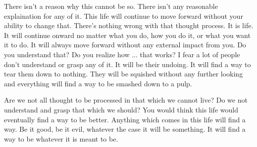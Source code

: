 There isn't a reason why this cannot be so. There isn't any reasonable
explaination for any of it. This life will continue to move forward without your
ability to change that. There's nothing wrong with that thought process. It is
life. It will continue onward no matter what you do, how you do it, or what you
want it to do. It will always move forward without any external impact from you.
Do you understand that? Do you realize how ... that works? I fear a lot of
people don't understand or grasp any of it. It will be their undoing. It will
find a way to tear them down to nothing. They will be squished without any
further looking and everything will find a way to be smashed down to a pulp.

Are we not all thought to be processed in that which we cannot live? Do we not
understand and grasp that which we should? You would think this life would
eventually find a way to be better. Anything which comes in this life will find
a way. Be it good, be it evil, whatever the case it will be something. It will
find a way to be whatever it is meant to be.